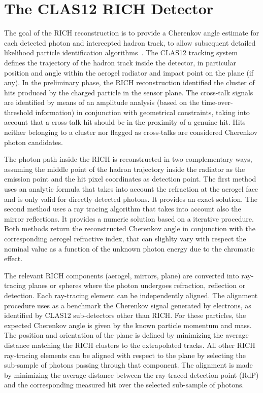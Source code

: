 \section{\bf The CLAS12 RICH Detector}

The goal of the RICH reconstruction is to provide a Cherenkov angle estimate for each detected photon and intercepted hadron track, to allow subsequent detailed likelihood particle identification algorithms~\cite{Ref:CLASRICH}. The CLAS12 tracking system defines the trajectory of the hadron track inside the detector, in particular position and angle within the aerogel radiator and impact point on the \MaPMT plane (if any). In the preliminary phase, the RICH reconstruction identified the cluster of hits produced by the charged particle in the sensor plane. The cross-talk signals are identified by means of an amplitude analysis (based on the time-over-threshold information) in conjunction with geometrical constraints, taking into account that a cross-talk hit should be in the proximity of a genuine hit. Hits neither belonging to a cluster nor flagged as cross-talks are considered Cherenkov photon candidates. 

The photon path inside the RICH is reconstructed in two complementary ways, assuming the middle point of the hadron trajectory inside the radiator as the emission point and the hit pixel coordinates as detection point. The first method uses an analytic formula that takes into account the refraction at the aerogel face and is only valid for directly detected photons. It provides an exact solution. The second method uses a ray tracing algorithm that takes into account also the mirror reflections. It provides a numeric solution based on a iterative procedure. Both methods return the reconstructed Cherenkov angle in conjunction with the corresponding aerogel refractive index, that can slighlty vary with respect the nominal value as a function of the unknown photon energy due to the chromatic effect. 

The relevant RICH components (aerogel, mirrors, \MaPMT plane) are converted into ray-tracing planes or spheres where the photon undergoes refraction, reflection or detection. Each ray-tracing element can be independently aligned. The alignment procedure uses as a benchmark the Cherenkov signal generated by electrons, as identified by CLAS12 sub-detectors other than RICH. For these particles, the expected Cherenkov angle is given by the known particle momentum and mass. The position and orientation of the \MaPMT plane is defined by minimizing the average distance matching the RICH clusters to the extrapolated tracks. All other RICH ray-tracing elements can be aligned with respect to the \MaPMT plane by selecting the sub-sample of photons passing through that component. The alignment is made by minimizing the average distance between the ray-traced detection point (RdP) and the corresponding measured \MaPMT hit over the selected sub-sample of photons.

